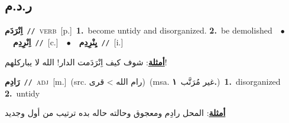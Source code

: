 \documentclass[10pt,a4paper,twoside]{article} %
\begin{document}
\begin{multicols}{2}
\vspace{-3mm}
\subsection*{\color{blue}\foreignlanguage{arabic}{ر.د.م}\color{blue}{}} 

{\setlength\topsep{0pt}\textbf{\foreignlanguage{arabic}{اِنْرَدَم}}\ {\color{gray}\texttt{//}\color{black}}\ \textsc{verb}\ [p.]\ \textbf{1.}~become untidy and disorganized.  \textbf{2.}~be demolished\ \ $\bullet$\ \ \setlength\topsep{0pt}\textbf{\foreignlanguage{arabic}{اِنْرِدِم}}\ {\color{gray}\texttt{//}\color{black}}\ [c.]\ \ $\bullet$\ \ \setlength\topsep{0pt}\textbf{\foreignlanguage{arabic}{يِنْرِدِم}}\ {\color{gray}\texttt{//}\color{black}}\ [i.]\  \begin{flushright}\color{gray}\foreignlanguage{arabic}{\textbf{\underline{\foreignlanguage{arabic}{أمثلة}}}: شوف كيف اِنْرَدَمت الدار! الله لا يباركلهم!}\end{flushright}\color{black}} \vspace{2mm}

{\setlength\topsep{0pt}\textbf{\foreignlanguage{arabic}{رَادِم}}\ {\color{gray}\texttt{//}\color{black}}\ \textsc{adj}\ [m.]\ (src. \color{gray}\foreignlanguage{arabic}{رام الله > قرى}\color{black})\ \color{gray}(msa. \foreignlanguage{arabic}{غير مُرَتَّب}~\foreignlanguage{arabic}{\textbf{١.}})\color{black}\ \textbf{1.}~disorganized  \textbf{2.}~untidy\  \begin{flushright}\color{gray}\foreignlanguage{arabic}{\textbf{\underline{\foreignlanguage{arabic}{أمثلة}}}: المحل رادِم ومعجوق وحالته حاله بده ترتيب من أول وجديد}\end{flushright}\color{black}} \vspace{2mm}


\end{multicols}
\end{document}
